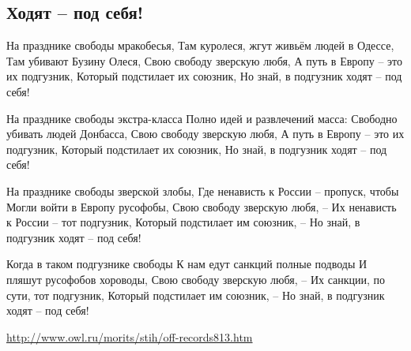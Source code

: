  
 
 
 
 
\subsection{Ходят – под себя!}

На празднике свободы мракобесья,
Там куролеся, жгут живьём людей в Одессе,
Там убивают Бузину Олеся,
Свою свободу зверскую любя,
А путь в Европу – это их подгузник,
Который подстилает их союзник,
Но знай, в подгузник ходят – под себя!

На празднике свободы экстра-класса
Полно идей и развлечений масса:
Свободно убивать людей Донбасса,
Свою свободу зверскую любя,
А путь в Европу – это их подгузник,
Который подстилает их союзник,
Но знай, в подгузник ходят – под себя!

На празднике свободы зверской злобы,
Где ненависть к России – пропуск, чтобы
Могли войти в Европу русофобы,
Свою свободу зверскую любя, –
Их ненависть к России – тот подгузник,
Который подстилает им союзник, –
Но знай, в подгузник ходят – под себя!

Когда в таком подгузнике свободы
К нам едут санкций полные подводы
И пляшут русофобов хороводы,
Свою свободу зверскую любя, –
Их санкции, по сути, тот подгузник,
Который подстилает им союзник, –
Но знай, в подгузник ходят – под себя!

\url{http://www.owl.ru/morits/stih/off-records813.htm}
